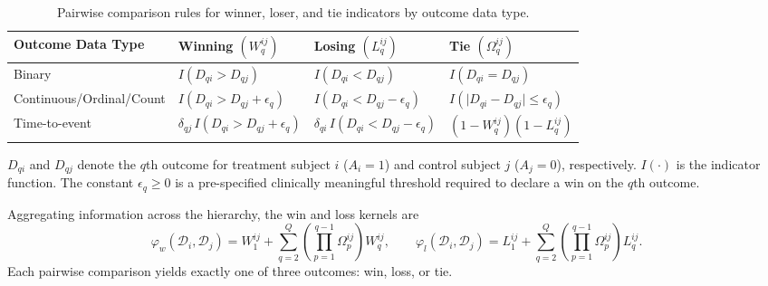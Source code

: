 \documentclass[11pt,a4paper]{article}
\begin{document}
\begin{table}[ht]
\begin{threeparttable}
\caption{Pairwise comparison rules for winner, loser, and tie indicators by outcome data type.}
\label{tab:comparison_rules}
\footnotesize
\begin{center}
\begin{tabular}{llll}
\toprule
\textbf{Outcome Data Type} & \textbf{Winning $\left(W_q^{ij}\right)$} & \textbf{Losing $\left(L_q^{ij}\right)$} & \textbf{Tie $\left(\Omega_q^{ij}\right)$} \\
\midrule
Binary & $I\!\left(D_{qi} > D_{qj}\right)$ & $I\!\left(D_{qi} < D_{qj}\right)$ & $I\!\left(D_{qi} = D_{qj}\right)$ \\
\addlinespace
Continuous/Ordinal/Count & $I\!\left( D_{qi} > D_{qj} + \epsilon_q \right)$ & $I\!\left(D_{qi} < D_{qj} - \epsilon_q\right)$ & $I\!\left(\big|D_{qi} - D_{qj}\big| \le \epsilon_q\right)$ \\
\addlinespace
Time-to-event & $\delta_{qj}\, I\!\left(D_{qi} > D_{qj} + \epsilon_q\right)$ & $\delta_{qi}\, I\!\left(D_{qi} < D_{qj} - \epsilon_q\right)$ & $\left(1 - W_q^{ij}\right)\!\left(1 - L_q^{ij}\right)$ \\
\bottomrule
\end{tabular}
\begin{tablenotes}\footnotesize
    \item $D_{qi}$ and $D_{qj}$ denote the $q$th outcome for treatment subject $i$ ($A_i=1$)
    and control subject $j$ ($A_j=0$), respectively. $I(\cdot)$ is the indicator function.
    The constant $\epsilon_q \ge 0$ is a pre-specified clinically meaningful threshold
    required to declare a win on the $q$th outcome.
\end{tablenotes}
\end{center}
\end{threeparttable}
\end{table}

Aggregating information across the hierarchy, the win and loss kernels are
\begin{equation}
\varphi_w(\mathcal{D}_i, \mathcal{D}_j) = W_1^{ij} + \sum_{q=2}^{Q}
\left( \prod_{p=1}^{q-1} \Omega_p^{ij} \right) W_q^{ij},
\qquad
\varphi_l(\mathcal{D}_i, \mathcal{D}_j) = L_1^{ij} + \sum_{q=2}^{Q}
\left( \prod_{p=1}^{q-1} \Omega_p^{ij} \right) L_q^{ij}.
\label{eq:kernel_functions}
\end{equation}
Each pairwise comparison yields exactly one of three outcomes: win, loss, or tie.
\end{document}
